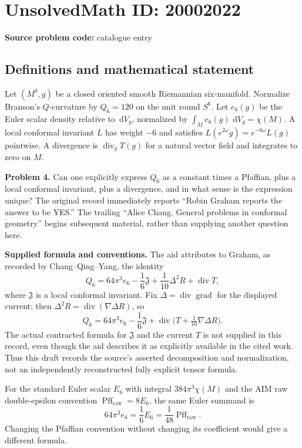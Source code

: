 \documentclass[11pt]{article}
\newcommand{\dd}{\,\mathrm{d}}
\begin{document}
\section*{UnsolvedMath ID: 20002022}
\textbf{Source problem code:} catalogue entry
\subsection{Definitions and mathematical statement}
Let $(M^6,g)$ be a closed oriented smooth Riemannian six-manifold. Normalize Branson's $Q$-curvature by $Q_6=120$ on the unit round $S^6$. Let $e_6(g)$ be the Euler scalar density relative to $\dd V_g$, normalized by $\int_M e_6(g)\,\dd V_g=\chi(M)$. A local conformal invariant $L$ has weight $-6$ and satisfies $L(e^{2\omega}g)=e^{-6\omega}L(g)$ pointwise. A divergence is $\operatorname{div}_gT(g)$ for a natural vector field and integrates to zero on $M$.

\textbf{Problem 4.} Can one explicitly express $Q_6$ as a constant times a Pfaffian, plus a local conformal invariant, plus a divergence, and in what sense is the expression unique? The original record immediately reports ``Robin Graham reports the answer to be YES.'' The trailing ``Alice Chang. General problems in conformal geometry'' begins subsequent material, rather than supplying another question here.

\textbf{Supplied formula and conventions.} The aid attributes to Graham, as recorded by Chang--Qing--Yang, the identity
\[
 Q_6=64\pi^3 e_6-\frac16\mathfrak J
                 +\frac1{10}\Delta^2R+\operatorname{div}T,
\]
where $\mathfrak J$ is a local conformal invariant. Fix $\Delta=\operatorname{div}\operatorname{grad}$ for the displayed current; then $\Delta^2R=\operatorname{div}(\nabla\Delta R)$, so
\[
 Q_6=64\pi^3e_6-\frac16\mathfrak J
             +\operatorname{div}\bigl(T+\tfrac1{10}\nabla\Delta R\bigr).
\]
The actual contracted formula for $\mathfrak J$ and the current $T$ is not supplied in this record, even though the aid describes it as explicitly available in the cited work. Thus this draft records the source's asserted decomposition and normalization, not an independently reconstructed fully explicit tensor formula.

For the standard Euler scalar $E_6$ with integral $384\pi^3\chi(M)$ and the AIM raw double-epsilon convention $\operatorname{Pff}_{\mathrm{raw}}=8E_6$, the same Euler summand is
\[
 64\pi^3e_6=\frac16E_6=\frac1{48}\operatorname{Pff}_{\mathrm{raw}}.
\]
Changing the Pfaffian convention without changing its coefficient would give a different formula.
\end{document}
